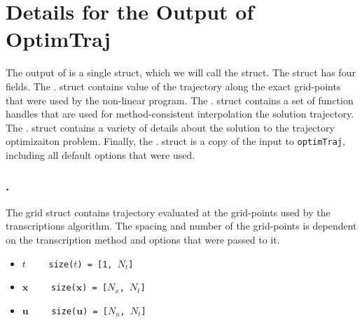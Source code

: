\section{Details for the Output of OptimTraj}
The output of  is a single struct, which we will call the  struct. The  struct has four fields. The . struct contains value of the trajectory along the exact grid-points that were used by the non-linear program.  The . struct contains a set of function handles that are used for method-consistent interpolation the solution trajectory. The . struct contains a variety of details about the solution to the trajectory optimizaiton problem. Finally, the . struct is a copy of the input to \texttt{optimTraj}, including all default options that were used.


\subsubsection*{.}
The grid struct contains trajectory evaluated at the grid-points used by the transcriptions algorithm. The spacing and number of the grid-points is dependent on the transcription method and options that were passed to it.
\begin{itemize} \setlength\itemsep{-0.1em}
\item {}\tc{ = }$t \qquad$ \texttt{size($t$) = [1, $N_t$]}
\item {}\tc{ = }$\bm{x} \qquad$ \texttt{size($\bm{x}$) = [$N_x$, $N_t$]}
\item {}\tc{ = }$\bm{u} \qquad$ \texttt{size($\bm{u}$) = [$N_u$, $N_t$]}
\end{itemize}


